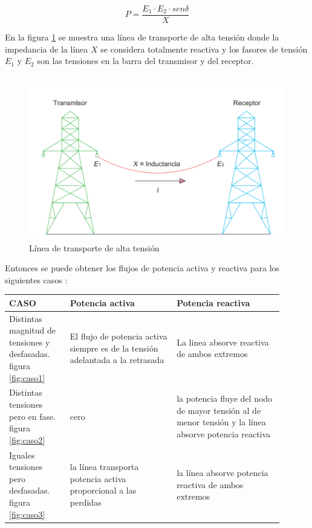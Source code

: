 \documentclass[a5paper]{book}%
\begin{document}
\begin{equation}
	\label{eq:1}
	P=\dfrac{E_{1} \cdot E_{2} \cdot sen\delta } {X}
\end{equation}

En la figura \ref{fig:lineaat} se muestra una línea de transporte de alta tensión donde la impedancia de la línea \textit{$X$} se considera totalmente reactiva y los fasores de tensión  \textbf{$E_{1}$ }y \textbf{$E_{2}$} son las tensiones en la barra del transmisor y del receptor.\\\\

\begin{figure}[H]
	\centering
	
	\caption{Línea de transporte de alta tensión}
	\label{fig:lineaat}
	\includegraphics[width=\linewidth]{linea_transporte_AT}
\end{figure}

Entonces se puede obtener los flujos de potencia activa y reactiva
para los siguientes casos \cite{trashorras2015subestaciones}:

\begin{tabular}[H]{|p{0.2\linewidth}|p{0.35\linewidth}|p{0.35\linewidth}|}
	\hline
	CASO & Potencia \textbf{activa} & Potencia \textbf{reactiva}\\\hline
	Distintas magnitud de tensiones  y desfasadas. figura \ref{fig:caso1}  & El flujo de potencia activa siempre es de la tensión adelantada a la  retrasada& La linea absorve reactiva de ambos extremos\\\hline
	Distintas tensiones pero en fase. figura \ref{fig:caso2} & cero&la potencia fluye del nodo  de mayor tensión al de menor tensión y la línea absorve potencia reactiva  \\\hline
	Iguales tensiones pero desfasadas. figura \ref{fig:caso3}  &la línea transporta potencia activa proporcional a las perdidas &la línea absorve potencia reactiva de ambos extremos\\\hline
\end{tabular}
\end{document}
